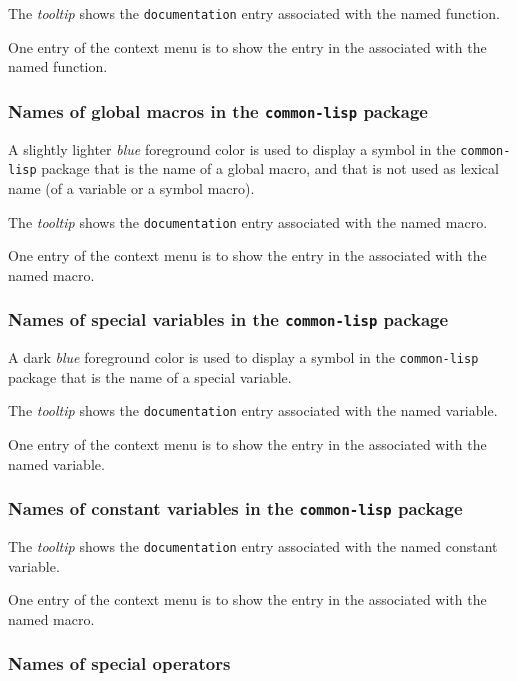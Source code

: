 The \emph{tooltip} shows the \texttt{documentation} entry associated
with the named function.

One entry of the context menu is to show the entry in the \hs{}
associated with the named function.

\subsubsection{Names of global macros in the \texttt{common-lisp} package}

A slightly lighter \emph{blue} foreground color is used to display a
symbol in the \texttt{common-lisp} package that is the name of a
global macro, and that is not used as lexical name (of a variable or a
symbol macro).

The \emph{tooltip} shows the \texttt{documentation} entry associated
with the named macro.

One entry of the context menu is to show the entry in the \hs{}
associated with the named macro.

\subsubsection{Names of special variables in the \texttt{common-lisp} package}

A dark \emph{blue} foreground color is used to display a symbol in the
\texttt{common-lisp} package that is the name of a special variable.

The \emph{tooltip} shows the \texttt{documentation} entry associated
with the named variable.

One entry of the context menu is to show the entry in the \hs{}
associated with the named variable.

\subsubsection{Names of constant variables in the \texttt{common-lisp} package}

The \emph{tooltip} shows the \texttt{documentation} entry associated
with the named constant variable.

One entry of the context menu is to show the entry in the \hs{}
associated with the named macro.

\subsubsection{Names of special operators}


